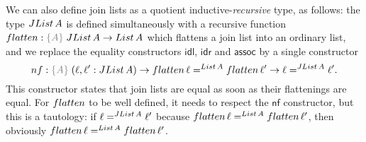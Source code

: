\documentclass[a4paper,UKenglish,numberwithinsect,cleveref,thm-restate]{lipics-v2021}
\begin{document}
We can also define join lists as a quotient inductive-\emph{recursive} type, as follows: the type $\JList{A}$ is defined simultaneously with a recursive function $\flatten : \implicit{A}\;\JList{A} \to \List{A}$ which flattens a join list into an ordinary list, and we replace the equality constructors $\mathsf{idl}$, $\mathsf{idr}$ and $\mathsf{assoc}$ by a single constructor
\[
  \mathsf{nf} : \implicit{A}\;(\ell, \ell' : \JList{A}) \to \flatten\,\ell =^{\mathsf{List}\,A} \flatten\,\ell' \to \ell =^{\JList{A}} \ell'.
\]
This constructor states that join lists are equal as soon as their flattenings are equal. For $\flatten$ to be well defined, it needs to respect the $\mathsf{nf}$ constructor, but this is a tautology: if $\ell =^{\JList{A}} \ell'$ because $\flatten\,\ell =^{\mathsf{List}\,A} \flatten\,\ell'$, then obviously $\flatten\,\ell =^{\mathsf{List}\,A} \flatten\,\ell'$.

\end{document}

